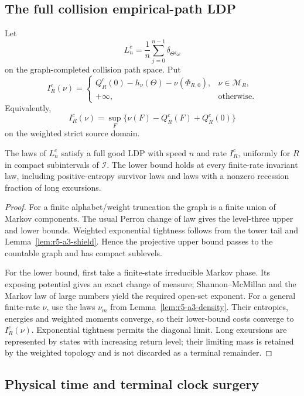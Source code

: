 \subsection{The full collision empirical-path LDP}

Let
\[
 L_n^c=\frac1n\sum_{j=0}^{n-1}\delta_{\Theta^j\omega}
\]
on the graph-completed collision path space.  Put
\[
 I_R^c(\nu)=
 \begin{cases}
  Q_R^c(0)-h_\nu(\Theta)-\nu(\Phi_{R,0}),
  &\nu\in\mathcal M_R,\\
  +\infty,&\text{otherwise}.
 \end{cases}
\]
Equivalently,
\[
 I_R^c(\nu)=\sup_F\{\nu(F)-Q_R^c(F)+Q_R^c(0)\}
\]
on the weighted strict source domain.

\begin{theorem}
\label{thm:r5-a3-collision-ldp}
The laws of \(L_n^c\) satisfy a full good LDP with speed \(n\) and rate
\(I_R^c\), uniformly for \(R\) in compact subintervals of \(\mathcal I\).
The lower bound holds at every finite-rate invariant law, including
positive-entropy survivor laws and laws with a nonzero recession fraction of
long excursions.
\end{theorem}

\begin{proof}
For a finite alphabet/weight truncation the graph is a finite union of Markov
components.  The usual Perron change of law gives the level-three upper and
lower bounds.  Weighted exponential tightness follows from the tower tail and
Lemma~\ref{lem:r5-a3-shield}.  Hence the projective upper bound passes to the
countable graph and has compact sublevels.

For the lower bound, first take a finite-state irreducible Markov phase.  Its
exposing potential gives an exact change of measure; Shannon--McMillan and the
Markov law of large numbers yield the required open-set exponent.  For a
general finite-rate \(\nu\), use the laws \(\nu_m\) from
Lemma~\ref{lem:r5-a3-density}.  Their entropies, energies and weighted moments
converge, so their lower-bound costs converge to \(I_R^c(\nu)\).  Exponential
tightness permits the diagonal limit.  Long excursions are represented by
states with increasing return level; their limiting mass is retained by the
weighted topology and is not discarded as a terminal remainder.
\end{proof}

\subsection{Physical time and terminal clock surgery}

